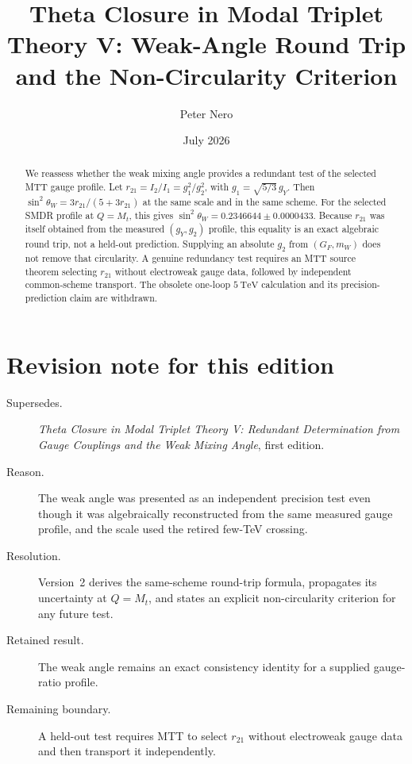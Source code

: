 \documentclass[11pt]{article}
\title{Theta Closure in Modal Triplet Theory V:
Weak-Angle Round Trip and the Non-Circularity Criterion}
\author{Peter Nero}
\date{July 2026}
\begin{document}
\maketitle

\begin{abstract}
We reassess whether the weak mixing angle provides a redundant test of the
selected MTT gauge profile. Let
$r_{21}=I_2/I_1=g_1^2/g_2^2$, with $g_1=\sqrt{5/3}\,g_Y$. Then
$\sin^2\theta_W=3r_{21}/(5+3r_{21})$ at the same scale and in the same scheme.
For the selected SMDR profile at $Q=M_t$, this gives
$\sin^2\theta_W=0.2346644\pm0.0000433$. Because $r_{21}$ was itself obtained
from the measured $(g_Y,g_2)$ profile, this equality is an exact algebraic
round trip, not a held-out prediction. Supplying an absolute $g_2$ from
$(G_F,m_W)$ does not remove that circularity. A genuine redundancy test
requires an MTT source theorem selecting $r_{21}$ without electroweak gauge
data, followed by independent common-scheme transport. The obsolete one-loop
$5~\mathrm{TeV}$ calculation and its precision-prediction claim are withdrawn.
\end{abstract}

\section*{Revision note for this edition}
\begin{description}
\item[Supersedes.] \emph{Theta Closure in Modal Triplet Theory V: Redundant
Determination from Gauge Couplings and the Weak Mixing Angle}, first edition.
\item[Reason.] The weak angle was presented as an independent precision test
even though it was algebraically reconstructed from the same measured gauge
profile, and the scale used the retired few-TeV crossing.
\item[Resolution.] Version~2 derives the same-scheme round-trip formula,
propagates its uncertainty at $Q=M_t$, and states an explicit non-circularity
criterion for any future test.
\item[Retained result.] The weak angle remains an exact consistency identity
for a supplied gauge-ratio profile.
\item[Remaining boundary.] A held-out test requires MTT to select $r_{21}$
without electroweak gauge data and then transport it independently.
\end{description}
\end{document}
